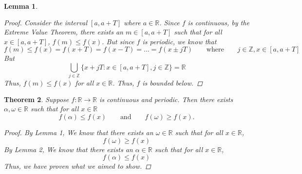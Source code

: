 \documentclass{amsart}
\newtheorem{theorem}{Theorem}
\newtheorem{lemma}[theorem]{Lemma}
\begin{document}
\begin{enumerate}[1.]
\begin{lemma}
\begin{proof}
            Consider the interval $[a, a+ T]$ where $a \in \mathbb{R}$. Since $f$ is continuous, by the Extreme Value Theorem,  there exists an $m \in [a, a+T]$ such that for all $x \in [a, a+T]$,
            $f(m) \leq f(x)$. 
            But since $f$ is periodic, we know that 
            \[
                f(m) \leq f(x) = f(x+ T) = f(x - T) = ... = f(x \pm jT) \qquad \text{where} \qquad j \in \mathbb{Z}, x \in [a, a+ T]   
            \]
            But
            \[
                \bigcup_{j \in \mathbb{Z}} \{ x + jT : x\in [a, a+T], j \in \mathbb{Z}\} = \mathbb{R}    
            \]
            Thus, $f(m) \leq f(x)$ for all $x \in \mathbb{R}$. Thus, $f$ is bounded below.
        \end{proof}
    \end{lemma}
    \begin{theorem}
        Suppose $f: \mathbb{R} \to \mathbb{R}$ is continuous and periodic. Then there exists $\alpha,\omega \in \mathbb{R}$ such that for all $x \in \mathbb{R}$
        \[ f(\alpha) \leq f(x) \qquad \text{and} \qquad f(\omega) \geq f(x).\]
        \begin{proof}
            By Lemma 1, We know that there exists an $\omega \in \mathbb{R}$ such that for all $x \in \mathbb{R}$, 
            \[
                f(\omega) \geq f(x)    
            \]
            By Lemma 2, We know that there exists an $\alpha \in \mathbb{R}$ such that for all $x \in \mathbb{R}$, 
            \[
                f(\alpha) \leq f(x)    
            \]
            Thus, we have proven what we aimed to show.
        \end{proof}
    \end{theorem}
    

\end{enumerate}
\end{document}
